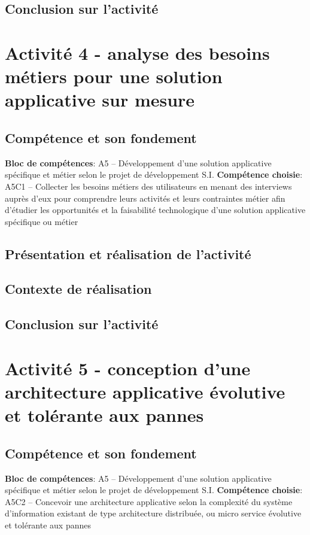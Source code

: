 \documentclass[a4paper, 11pt]{report}
\begin{document}
\subsection{Conclusion sur l'activité}

\section{Activité 4 - analyse des besoins métiers pour une solution applicative sur mesure}
\subsection{Compétence et son fondement}
\textbf{Bloc de compétences}: A5 – Développement d’une solution applicative spécifique et métier selon le projet de développement S.I.
\newline
\textbf{Compétence choisie}: A5C1 – Collecter les besoins métiers des utilisateurs en menant des interviews auprès d’eux pour comprendre leurs activités et leurs contraintes métier afin d’étudier les opportunités et la faisabilité technologique d’une solution applicative spécifique ou métier
\subsection{Présentation et réalisation de l'activité}
\subsection{Contexte de réalisation}
\subsection{Conclusion sur l'activité}

\section{Activité 5 - conception d'une architecture applicative évolutive et tolérante aux pannes}
\subsection{Compétence et son fondement}
\textbf{Bloc de compétences}: A5 – Développement d’une solution applicative spécifique et métier selon le projet de développement S.I.
\newline
\textbf{Compétence choisie}: A5C2 – Concevoir une architecture applicative selon la complexité du système d’information existant de type architecture distribuée, ou micro service évolutive et tolérante aux pannes
\end{document}
